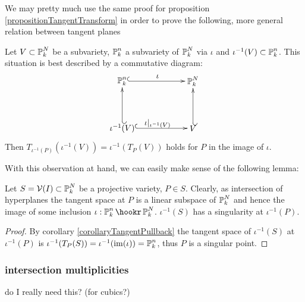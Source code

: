 We may pretty much use the same proof for proposition \ref{propositionTangentTransform} in order to prove the following, more general relation between tangent planes
\begin{corollary} \label{corollaryTangentPullback}
Let $V\subset \operatorname{\mathbb P}^N_k$ be a subvariety, $\operatorname{\mathbb P}^n_k$ a subvariety of $\operatorname{\mathbb P}^N_k$ via $\iota$ and $\iota^{-1}(V) \subset \operatorname{\mathbb P}^n_k$. This situation is best described by a commutative diagram:
\begin{equation}
\begin{xy}
(0,20)*+{\proj^n_k}="pn";
(30,20)*+{\proj^N_k}="pN";
(0,0)*+{\iota^{-1}(V)}="iv";
(30,0)*+{V}="v";
{\ar@{^{(}->} "pn";"pN"}?*!/_2mm/{\iota};
{\ar@{^{(}->} "iv";"v"}?*!/_2mm/{\iota|_{\iota^{-1}(V)}};
{\ar@{_{(}->} "iv";"pn"};
{\ar@{_{(}->} "v";"pN"};
\end{xy}
\end{equation}
Then $T_{\iota^{-1}(P)}(\iota^{-1}(V)) = \iota^{-1}(T_P(V)) $ holds for $P$ in the image of $\iota$.
\end{corollary}

With this observation at hand, we can easily make sense of the following lemma:

\begin{lemma} \label{lemmaIntersectionWithTangent}
Let $S = \operatorname{\mathcal V}(I) \subset \operatorname{\mathbb P}^N_k$ be a projective variety, $P\in S$.
Clearly, as intersection of hyperplanes the tangent space at $P$ is a linear subspace of $\operatorname{\mathbb P}^N_k$ and hence the image of some inclusion $\iota : \proj^n_k \hookr \proj^N_k$.
$\iota^{-1}(S)$ has a singularity at $\iota^{-1}(P)$.
\end{lemma}
\begin{proof}
By corollary \ref{corollaryTangentPullback} the tangent space of $\iota^{-1}(S)$ at $\iota^{-1}(P)$ is $\iota^{-1}(T_P(S)) = \iota^{-1}({\operatorname{im}}(\iota)) = \operatorname{\mathbb P}^n_k$, thus $P$ is a singular point.
\end{proof}


\subsubsection{intersection multiplicities}

\begin{todo}
\item do I really need this? (for cubics?)
\end{todo}
